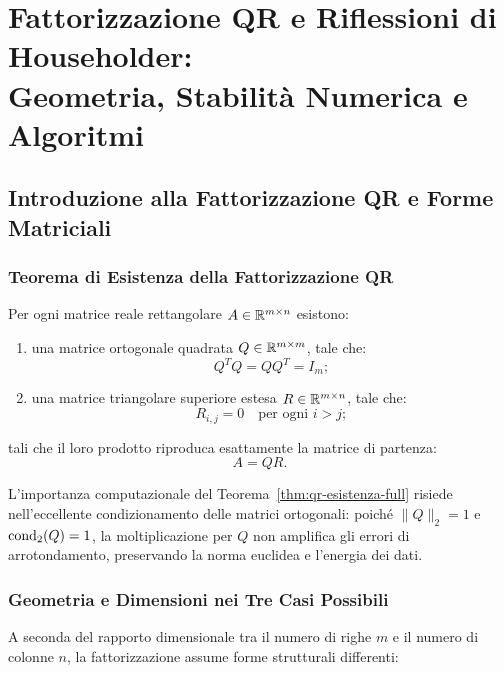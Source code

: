 \chapter[Fattorizzazione QR e Riflessioni di Householder]{Fattorizzazione QR e Riflessioni di Householder:\\Geometria, Stabilit\`a Numerica e Algoritmi}
\label{chap:fattorizzazione-qr-riflessioni-householder}

\FloatBarrier
\section{Introduzione alla Fattorizzazione QR e Forme Matriciali}
\label{sec:intro-forme-qr}

\subsection{Teorema di Esistenza della Fattorizzazione QR}

\begin{theorem}
\label{thm:qr-esistenza-full}
Per ogni matrice reale rettangolare $A \in \mathbb{R}^{m \times n}$ esistono:
\begin{enumerate}
    \item una matrice ortogonale quadrata $Q \in \mathbb{R}^{m \times m}$, tale che:
    \begin{equation}
        Q^T Q = Q Q^T = I_m;
    \end{equation}
    \item una matrice triangolare superiore estesa $R \in \mathbb{R}^{m \times n}$, tale che:
    \begin{equation}
        R_{i,j} = 0 \quad \text{per ogni } i > j;
    \end{equation}
\end{enumerate}
tali che il loro prodotto riproduca esattamente la matrice di partenza:
\begin{equation}
    A = Q R.
\end{equation}
\end{theorem}

L'importanza computazionale del Teorema~\ref{thm:qr-esistenza-full} risiede nell'eccellente condizionamento delle matrici ortogonali: poich\'e $\|Q\|_2 = 1$ e $\operatorname{cond}_2(Q) = 1$, la moltiplicazione per $Q$ non amplifica gli errori di arrotondamento, preservando la norma euclidea e l'energia dei dati.

\subsection{Geometria e Dimensioni nei Tre Casi Possibili}
A seconda del rapporto dimensionale tra il numero di righe $m$ e il numero di colonne $n$, la fattorizzazione assume forme strutturali differenti:

